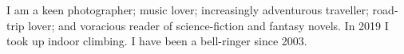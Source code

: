 \descript{}
\location{}
I am a keen photographer; music lover; increasingly adventurous traveller; road-trip lover; and voracious reader of science-fiction and fantasy novels.
In 2019 I took up indoor climbing.
I have been a bell-ringer since 2003.

\sectionsep{}
